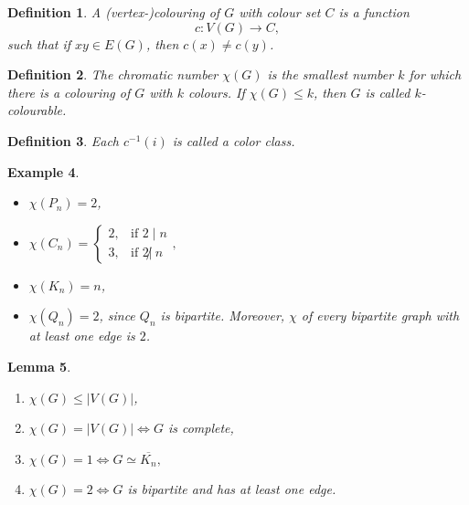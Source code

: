 \documentclass[a4paper]{article}
\theoremstyle{plain}
\newtheorem{lemma}{Lemma}
\newtheorem{definition}[lemma]{Definition}
\theoremstyle{myremark}
\newtheorem{example}[lemma]{Example}
\begin{document}
\begin{definition} A \emph{(vertex-)colouring} of $G$ with colour set $C$ is a function
$$c:V(G)\longrightarrow C,$$
such that if $xy\in E(G)$, then $c(x)\neq c(y)$.
\end{definition}

\begin{definition} The \emph{chromatic number} $\chi(G)$ is the smallest number $k$ for which there is a colouring of $G$ with $k$ colours. If $\chi(G)\leqslant k$, then $G$ is called \emph{$k$-colourable}.
\end{definition}

\begin{definition} Each $c^{-1}(i)$ is called a \emph{color class}.
\end{definition}

\begin{example}
\begin{itemize}
\item $\chi(P_n)=2$,
\item $\chi(C_n)=
\begin{cases} 
2, & \text{if } 2\mid n\\ 
3, & \text{if } 2\not| \ n
\end{cases},$
\item $\chi(K_n)=n$,
\item $\chi(Q_n)=2$, since $Q_n$ is bipartite. Moreover, $\chi$ of every bipartite graph with at least one edge is $2$.
\end{itemize}
\end{example}

\begin{lemma}
\begin{enumerate}
\item $\chi(G)\leqslant |V(G)|$,
\item $\chi(G)=|V(G)| \Longleftrightarrow G$ is complete,
\item $\chi(G)=1 \Longleftrightarrow G \simeq \overline{K_n},$
\item $\chi(G)=2 \Longleftrightarrow G$ is bipartite and has at least one edge.
\end{enumerate}
\end{lemma}
\end{document}
